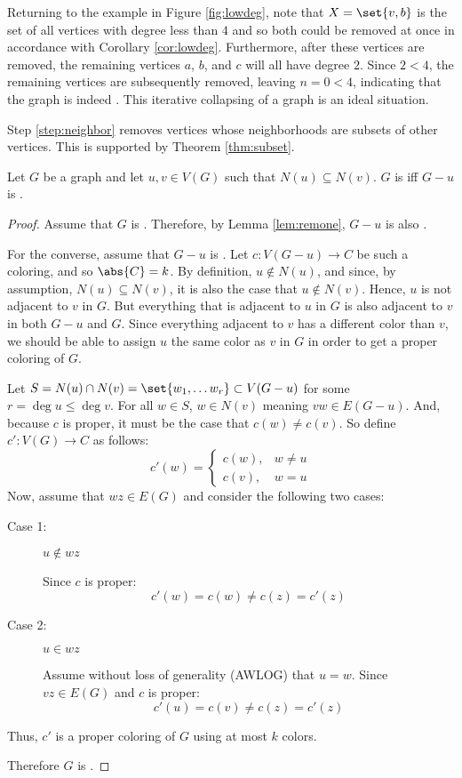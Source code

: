 Returning to the example in Figure \ref{fig:lowdeg}, note that \(X=\set{v,b}\) is the set of all vertices with
degree less than \(4\) and so both could be removed at once in accordance with Corollary \ref{cor:lowdeg}.
Furthermore, after these vertices are removed, the remaining vertices \(a\), \(b\), and \(c\) will all have degree
\(2\).  Since \(2<4\), the remaining vertices are subsequently removed, leaving \(n=0<4\), indicating that the
graph is indeed .  This iterative collapsing of a graph is an ideal situation.

Step \ref{step:neighbor} removes vertices whose neighborhoods are subsets of other vertices.  This is supported by
Theorem \ref{thm:subset}.

\begin{theorem}
  \label{thm:subset}
  Let \(G\) be a graph and let \(u,v\in V(G)\) such that \(N(u)\subseteq N(v)\).  \(G\) is  iff \(G-u\)
  is .
\end{theorem}

\begin{proof}
  Assume that \(G\) is .  Therefore, by Lemma \ref{lem:remone}, \(G-u\) is also .

  For the converse, assume that \(G-u\) is .  Let \(c:V(G-u)\to C\) be such a coloring, and so
  \(\abs{C}=k\).  By definition, \(u\notin N(u)\), and since, by assumption, \(N(u)\subseteq N(v)\), it is also the
  case that \(u\notin N(v)\).  Hence, \(u\) is not adjacent to \(v\) in \(G\).  But everything that is adjacent to
  \(u\) in \(G\) is also adjacent to \(v\) in both \(G-u\) and \(G\).  Since everything adjacent to \(v\) has a
  different color than \(v\), we should be able to assign \(u\) the same color as \(v\) in \(G\) in order to get a
  proper coloring of \(G\).

  Let \(S=N(u)\cap N(v)=\set{w_1,\ldots w_r}\subset V(G-u)\) for some \(r=\deg{u}\le \deg{v}\).  For all \(w\in
  S\), \(w\in N(v)\) meaning \(vw\in E(G-u)\).  And, because \(c\) is proper, it must be the case that \(c(w)\ne
  c(v)\).  So define \(c':V(G)\to C\) as follows:
  \[c'(w)=\begin{cases}
  c(w), & w\ne u \\
  c(v), & w=u
  \end{cases}\]
  Now, assume that \(wz\in E(G)\) and consider the following two cases:
  \begin{description}
  \item[Case 1:] \(u\notin wz\)

    Since \(c\) is proper:
    \[c'(w)=c(w)\ne c(z)=c'(z)\]
  \item[Case 2:] \(u\in wz\)

    Assume without loss of generality (AWLOG) that \(u=w\).  Since \(vz\in E(G)\) and \(c\) is proper:
    \[c'(u)=c(v)\ne c(z)=c'(z)\]
  \end{description}
  Thus, \(c'\) is a proper coloring of \(G\) using at most \(k\) colors.

  Therefore \(G\) is .
\end{proof}

